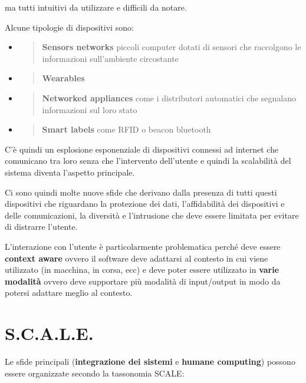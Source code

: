 ma tutti intuitivi da utilizzare e difficili da notare.

Alcune tipologie di dispositivi sono:

\begin{itemize}
\item
  \begin{quote}
  \textbf{Sensors networks} piccoli computer dotati di sensori che
  raccolgono le informazioni sull'ambiente circostante
  \end{quote}
\item
  \begin{quote}
  \textbf{Wearables}
  \end{quote}
\item
  \begin{quote}
  \textbf{Networked appliances} come i distributori automatici che
  segnalano informazioni sul loro stato
  \end{quote}
\item
  \begin{quote}
  \textbf{Smart labels} come RFID o beacon bluetooth
  \end{quote}
\end{itemize}

C'è quindi un esplosione esponenziale di dispositivi connessi ad
internet che comunicano tra loro senza che l'intervento dell'utente e
quindi la scalabilità del sistema diventa l'aspetto principale.

Ci sono quindi molte nuove sfide che derivano dalla presenza di tutti
questi dispositivi che riguardano la protezione dei dati, l'affidabilità
dei dispositivi e delle comunicazioni, la diversità e l'intrusione che
deve essere limitata per evitare di distrarre l'utente.

L'interazione con l'utente è particolarmente problematica perché deve
essere \textbf{context aware} ovvero il software deve adattarsi al
contesto in cui viene utilizzato (in macchina, in corsa, ecc) e deve
poter essere utilizzato in \textbf{varie modalità} ovvero deve
supportare più modalità di input/output in modo da potersi adattare
meglio al contesto.

\section{S.C.A.L.E.}\label{s.c.a.l.e.}

Le sfide principali (\textbf{integrazione dei sistemi} e \textbf{humane
computing}) possono essere organizzate secondo la tassonomia SCALE:

